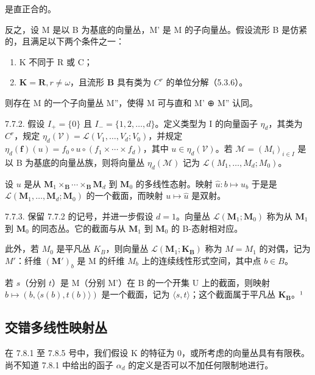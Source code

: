 是直正合的。

反之，设 M 是以 B 为基底的向量丛，M' 是 M 的子向量丛。假设流形 B 是仿紧的，且满足以下两个条件之一：

\begin{enumerate}
\def\labelenumi{(\roman{enumi})}
\item
  K 不同于 R 或 C；
\item
  \(\mathbf{K} = \mathbf{R}, r \neq \omega\)，且流形 \(\mathbf{B}\) 具有类为 \(C^r\) 的单位分解（5.3.6）。
\end{enumerate}

则存在 M 的一个子向量丛 M''，使得 M 可与直和 M' ⊕ M'' 认同。

7.7.2. 假设 \(I_{+}=\{0\}\) 且 \(I_{-}=\{1,2,\ldots,d\}\)。定义类型为 I 的向量函子 \(\eta_{d}\)，其类为 \(C^{r}\)，规定 \(\eta_{d}(\mathcal{V})=\mathcal{L}(V_{1},\ldots,V_{d};V_{0})\)，并规定 \(\eta_{d}(\mathbf{f})(u)=f_{0}\circ u\circ(f_{1}\times\cdots\times f_{d})\)，其中 \(u\in\eta_{d}(\mathcal{V})\)。若 \(\mathcal{M}=(M_{i})_{i\in I}\) 是以 B 为基底的向量丛族，则将向量丛 \(\eta_{d}(\mathcal{M})\) 记为 \(\mathcal{L}(M_{1},\ldots,M_{d};M_{0})\)。

设 \(u\) 是从 \(\mathbf{M}_{1} \times_{\mathbf{B}} \cdots \times_{\mathbf{B}} \mathbf{M}_{d}\) 到 \(\mathbf{M}_{0}\) 的多线性态射。映射 \(\hat{u}: b \mapsto u_{b}\) 于是是 \(\mathcal{L}(\mathbf{M}_{1}, \ldots, \mathbf{M}_{d}; \mathbf{M}_{0})\) 的一个截面，而映射 \(u \mapsto \hat{u}\) 是双射。

7.7.3. 保留 7.7.2 的记号，并进一步假设 \(d=1\)。向量丛 \(\mathcal{L}(\mathbf{M}_{1};\mathbf{M}_{0})\) 称为从 \(\mathbf{M}_{1}\) 到 \(\mathbf{M}_{0}\) 的同态丛。它的截面与从 \(\mathbf{M}_{1}\) 到 \(\mathbf{M}_{0}\) 的 B-态射相对应。

此外，若 \(M_{0}\) 是平凡丛 \(K_{B}\)，则向量丛 \(\mathcal{L}(\mathbf{M}_{1};\mathbf{K}_{\mathbf{B}})\) 称为 \(M = M_{1}\) 的对偶，记为 \(M'\)：纤维 \((\mathbf{M}')_{b}\) 是 M 的纤维 \(M_{b}\) 上的连续线性形式空间，其中点 \(b \in B\)。

若 \(s\)（分别 \(t\)）是 M（分别 M'）在 B 的一个开集 U 上的截面，则映射 \(b \mapsto (b, \langle s(b), t(b) \rangle)\) 是一个截面，记为 \(\langle s, t \rangle\)；这个截面属于平凡丛 \(\mathbf{K}_{\mathbf{B}}\)。¹

\subsection{交错多线性映射丛}

在 7.8.1 至 7.8.5 号中，我们假设 K 的特征为 0，或所考虑的向量丛具有有限秩。尚不知道 7.8.1 中给出的函子 \(\alpha_{d}\) 的定义是否可以不加任何限制地进行。

